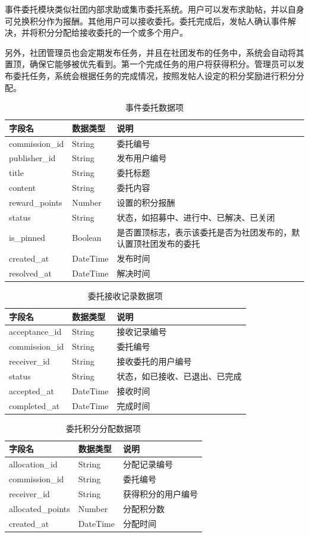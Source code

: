\documentclass[a4paper,12pt]{article}
\begin{document}
事件委托模块类似社团内部求助或集市委托系统。用户可以发布求助帖，并以自身可兑换积分作为报酬。其他用户可以接收委托。委托完成后，发帖人确认事件解决，并将积分分配给接收委托的一个或多个用户。

另外，社团管理员也会定期发布任务，并且在社团发布的任务中，系统会自动将其置顶，确保它能够被优先看到。第一个完成任务的用户将获得积分。管理员可以发布委托任务，系统会根据任务的完成情况，按照发帖人设定的积分奖励进行积分分配。

\begin{longtable}{p{3.5cm}p{3cm}p{7cm}}
\caption{事件委托数据项} \\
\toprule
字段名 & 数据类型 & 说明 \\
\midrule
commission\_id & String & 委托编号 \\
publisher\_id & String & 发布用户编号 \\
title & String & 委托标题 \\
content & String & 委托内容 \\
reward\_points & Number & 设置的积分报酬 \\
status & String & 状态，如招募中、进行中、已解决、已关闭 \\
is\_pinned & Boolean & 是否置顶标志，表示该委托是否为社团发布的，默认置顶社团发布的委托 \\
created\_at & DateTime & 发布时间 \\
resolved\_at & DateTime & 解决时间 \\
\bottomrule
\end{longtable}

\begin{longtable}{p{3.5cm}p{3cm}p{7cm}}
\caption{委托接收记录数据项} \\
\toprule
字段名 & 数据类型 & 说明 \\
\midrule
acceptance\_id & String & 接收记录编号 \\
commission\_id & String & 委托编号 \\
receiver\_id & String & 接收委托的用户编号 \\
status & String & 状态，如已接收、已退出、已完成 \\
accepted\_at & DateTime & 接收时间 \\
completed\_at & DateTime & 完成时间 \\
\bottomrule
\end{longtable}

\begin{longtable}{p{3.5cm}p{3cm}p{7cm}}
\caption{委托积分分配数据项} \\
\toprule
字段名 & 数据类型 & 说明 \\
\midrule
allocation\_id & String & 分配记录编号 \\
commission\_id & String & 委托编号 \\
receiver\_id & String & 获得积分的用户编号 \\
allocated\_points & Number & 分配积分数 \\
created\_at & DateTime & 分配时间 \\
\bottomrule
\end{longtable}
\end{document}
